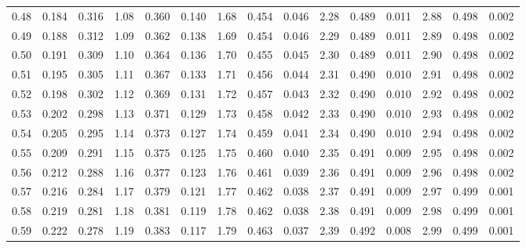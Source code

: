 \begin{table}[ht]
{\begin{tabular}[t]{r|rr|r|rr|r|rr|r|rr|r|rr}
			0.48 & 0.184 & 0.316 & 1.08 & 0.360 & 0.140 & 1.68 & 0.454 & 0.046 & 2.28 & 0.489 & 0.011 & 2.88 & 0.498 & 0.002 \\
			0.49 & 0.188 & 0.312 & 1.09 & 0.362 & 0.138 & 1.69 & 0.454 & 0.046 & 2.29 & 0.489 & 0.011 & 2.89 & 0.498 & 0.002 \\
			0.50 & 0.191 & 0.309 & 1.10 & 0.364 & 0.136 & 1.70 & 0.455 & 0.045 & 2.30 & 0.489 & 0.011 & 2.90 & 0.498 & 0.002 \\
			0.51 & 0.195 & 0.305 & 1.11 & 0.367 & 0.133 & 1.71 & 0.456 & 0.044 & 2.31 & 0.490 & 0.010 & 2.91 & 0.498 & 0.002 \\
			0.52 & 0.198 & 0.302 & 1.12 & 0.369 & 0.131 & 1.72 & 0.457 & 0.043 & 2.32 & 0.490 & 0.010 & 2.92 & 0.498 & 0.002 \\
			0.53 & 0.202 & 0.298 & 1.13 & 0.371 & 0.129 & 1.73 & 0.458 & 0.042 & 2.33 & 0.490 & 0.010 & 2.93 & 0.498 & 0.002 \\
			0.54 & 0.205 & 0.295 & 1.14 & 0.373 & 0.127 & 1.74 & 0.459 & 0.041 & 2.34 & 0.490 & 0.010 & 2.94 & 0.498 & 0.002 \\
			0.55 & 0.209 & 0.291 & 1.15 & 0.375 & 0.125 & 1.75 & 0.460 & 0.040 & 2.35 & 0.491 & 0.009 & 2.95 & 0.498 & 0.002 \\
			0.56 & 0.212 & 0.288 & 1.16 & 0.377 & 0.123 & 1.76 & 0.461 & 0.039 & 2.36 & 0.491 & 0.009 & 2.96 & 0.498 & 0.002 \\
			0.57 & 0.216 & 0.284 & 1.17 & 0.379 & 0.121 & 1.77 & 0.462 & 0.038 & 2.37 & 0.491 & 0.009 & 2.97 & 0.499 & 0.001 \\
			0.58 & 0.219 & 0.281 & 1.18 & 0.381 & 0.119 & 1.78 & 0.462 & 0.038 & 2.38 & 0.491 & 0.009 & 2.98 & 0.499 & 0.001 \\
			0.59 & 0.222 & 0.278 & 1.19 & 0.383 & 0.117 & 1.79 & 0.463 & 0.037 & 2.39 & 0.492 & 0.008 & 2.99 & 0.499 & 0.001 \\
			\hline
		\end{tabular}
	}
\end{table}
